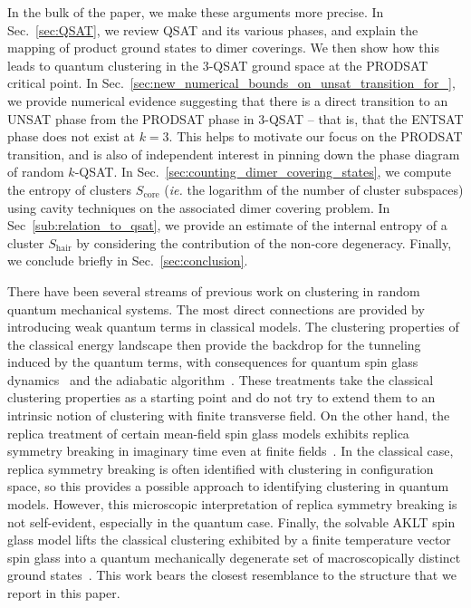 \documentclass[aps,pra,twocolumn,superscriptaddress,amsmath]{revtex4-1}
\newcommand{\Sc}{S_{\mathrm{core}}}
\begin{document}

In the bulk of the paper, we make these arguments more precise.
In Sec.~\ref{sec:QSAT}, we review QSAT and its various phases, and explain the mapping of product ground states to dimer coverings. 
We then show how this leads to quantum clustering in the 3-QSAT ground space at the PRODSAT critical point.
%
In Sec.~\ref{sec:new_numerical_bounds_on_unsat_transition_for_}, we provide numerical evidence suggesting that there is a direct transition to an UNSAT phase from the PRODSAT phase in 3-QSAT -- that is, that the ENTSAT phase does not exist at $k=3$. 
This helps to motivate our focus on the PRODSAT transition, and is also of independent interest in pinning down the phase diagram of random $k$-QSAT.
%
In Sec.~\ref{sec:counting_dimer_covering_states}, we compute the entropy of clusters $\Sc$ (\emph{ie.} the logarithm of the number of cluster subspaces) using cavity techniques on the associated dimer covering problem.
In Sec~\ref{sub:relation_to_qsat}, we provide an estimate of the internal entropy of a cluster $S_{\mathrm{hair}}$ by considering the contribution of the non-core degeneracy.
Finally, we conclude briefly in Sec.~\ref{sec:conclusion}.


There have been several streams of previous work on clustering in random quantum mechanical systems.
%
The most direct connections are provided by introducing weak quantum terms in classical models.
The clustering properties of the classical energy landscape then provide the backdrop for the tunneling induced by the quantum terms, with consequences for quantum spin glass dynamics~\cite{Goldschimdt1990, Laumann2014,Baldwin:2017aa, Laumann2008} and the adiabatic algorithm~\cite{Knysh:2006p9709,Knysh:2008dk,Altshuler2010, Foini2010, Bapst2013}. 
%
These treatments take the classical clustering properties as a starting point and do not try to extend them to an intrinsic notion of clustering with finite transverse field.
%
On the other hand, the replica treatment of certain mean-field spin glass models exhibits replica symmetry breaking in imaginary time even at finite fields~\cite{Goldschimdt1990, Ye1993}.
In the classical case, replica symmetry breaking is often identified with clustering in configuration space, so this provides a possible approach to identifying clustering in quantum models.
However, this microscopic interpretation of replica symmetry breaking is not self-evident, especially in the quantum case.
%
Finally, the solvable AKLT spin glass model lifts the classical clustering exhibited by a finite temperature vector spin glass into a quantum mechanically degenerate set of macroscopically distinct ground states~\cite{Laumann2010}. 
This work bears the closest resemblance to the structure that we report in this paper.
\end{document}
